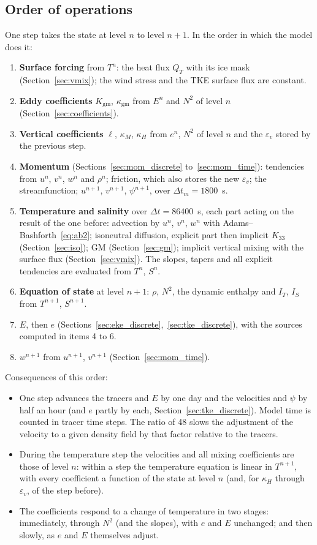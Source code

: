 \documentclass{article}
\begin{document}
\subsection{Order of operations}
One step takes the state at level $n$ to level $n+1$. In the order in which the model does it:
\begin{enumerate}
\item \textbf{Surface forcing} from $T^n$: the heat flux $Q_T$ with its ice mask (Section~\ref{sec:vmix}); the wind stress and the TKE surface flux are constant.
\item \textbf{Eddy coefficients} $K_\text{gm}$, $\kappa_\text{gm}$ from $E^n$ and $N^2$ of level $n$ (Section~\ref{sec:coefficients}).
\item \textbf{Vertical coefficients} $\ell$, $\kappa_M$, $\kappa_H$ from $e^n$, $N^2$ of level $n$ and the $\varepsilon_v$ stored by the previous step.
\item \textbf{Momentum} (Sections~\ref{sec:mom_discrete} to~\ref{sec:mom_time}): tendencies from $u^n$, $v^n$, $w^n$ and $\rho^n$; friction, which also stores the new $\varepsilon_v$; the streamfunction; $u^{n+1}$, $v^{n+1}$, $\psi^{n+1}$, over $\Delta t_m = 1800$~s.
\item \textbf{Temperature and salinity} over $\Delta t = 86400$~s, each part acting on the result of the one before: advection by $u^n$, $v^n$, $w^n$ with Adams--Bashforth~\eqref{eq:ab2}; isoneutral diffusion, explicit part then implicit $K_{33}$ (Section~\ref{sec:iso}); GM (Section~\ref{sec:gm}); implicit vertical mixing with the surface flux (Section~\ref{sec:vmix}). The slopes, tapers and all explicit tendencies are evaluated from $T^n$, $S^n$.
\item \textbf{Equation of state} at level $n+1$: $\rho$, $N^2$, the dynamic enthalpy and $I_T$, $I_S$ from $T^{n+1}$, $S^{n+1}$.
\item \textbf{$E$}, then \textbf{$e$} (Sections~\ref{sec:eke_discrete},~\ref{sec:tke_discrete}), with the sources computed in items 4 to 6.
\item \textbf{$w^{n+1}$} from $u^{n+1}$, $v^{n+1}$ (Section~\ref{sec:mom_time}).
\end{enumerate}
Consequences of this order:
\begin{itemize}
\item One step advances the tracers and $E$ by one day and the velocities and $\psi$ by half an hour (and $e$ partly by each, Section~\ref{sec:tke_discrete}). Model time is counted in tracer time steps. The ratio of 48 slows the adjustment of the velocity to a given density field by that factor relative to the tracers.
\item During the temperature step the velocities and all mixing coefficients are those of level $n$: within a step the temperature equation is linear in $T^{n+1}$, with every coefficient a function of the state at level $n$ (and, for $\kappa_H$ through $\varepsilon_v$, of the step before).
\item The coefficients respond to a change of temperature in two stages: immediately, through $N^2$ (and the slopes), with $e$ and $E$ unchanged; and then slowly, as $e$ and $E$ themselves adjust.
\end{itemize}
\end{document}
